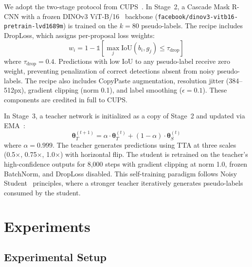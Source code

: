 \documentclass{bmvc2k}
\begin{document}
We adopt the two-stage protocol from CUPS~\cite{hahn2025cups}. In Stage~2, a Cascade Mask R-CNN with a frozen DINOv3 ViT-B/16~\cite{fang2025dinov3} backbone (\texttt{facebook/dinov3-vitb16-pretrain-lvd1689m}) is trained on the $k{=}80$ pseudo-labels. The recipe includes DropLoss, which assigns per-proposal loss weights:
\begin{equation}
w_i = 1 - \mathbb{1}[\max_j \text{IoU}(b_i, g_j) \leq \tau_\text{drop}]
\label{eq:droploss}
\end{equation}
where $\tau_\text{drop}{=}0.4$. Predictions with low IoU to any pseudo-label receive zero weight, preventing penalization of correct detections absent from noisy pseudo-labels. The recipe also includes CopyPaste augmentation, resolution jitter (384--512px), gradient clipping (norm 0.1), and label smoothing ($\epsilon{=}0.1$). These components are credited in full to CUPS.

In Stage~3, a teacher network is initialized as a copy of Stage~2 and updated via EMA~\cite{tarvainen2017mean}:
\begin{equation}
\boldsymbol{\theta}_T^{(t+1)} = \alpha \cdot \boldsymbol{\theta}_T^{(t)} + (1 - \alpha) \cdot \boldsymbol{\theta}_S^{(t)}
\label{eq:ema}
\end{equation}
where $\alpha{=}0.999$. The teacher generates predictions using TTA at three scales (0.5$\times$, 0.75$\times$, 1.0$\times$) with horizontal flip. The student is retrained on the teacher's high-confidence outputs for 8,000 steps with gradient clipping at norm 1.0, frozen BatchNorm, and DropLoss disabled. This self-training paradigm follows Noisy Student~\cite{xie2020noisy} principles, where a stronger teacher iteratively generates pseudo-labels consumed by the student.

\section{Experiments}
\label{sec:experiments}

\subsection{Experimental Setup}
\end{document}

